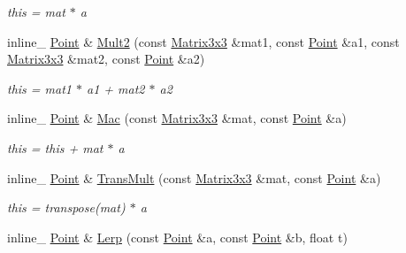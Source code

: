 \begin{DoxyCompactItemize}
\begin{DoxyCompactList}\small\item\em this = mat $\ast$ a \end{DoxyCompactList}\item 
\hypertarget{class_point_af01e8da4c2b949ca9729cab295c8a67b}{inline\+\_\+ \hyperlink{class_point}{Point} \& \hyperlink{class_point_af01e8da4c2b949ca9729cab295c8a67b}{Mult2} (const \hyperlink{class_matrix3x3}{Matrix3x3} \&mat1, const \hyperlink{class_point}{Point} \&a1, const \hyperlink{class_matrix3x3}{Matrix3x3} \&mat2, const \hyperlink{class_point}{Point} \&a2)}\label{class_point_af01e8da4c2b949ca9729cab295c8a67b}

\begin{DoxyCompactList}\small\item\em this = mat1 $\ast$ a1 + mat2 $\ast$ a2 \end{DoxyCompactList}\item 
\hypertarget{class_point_a9869c21470aa62c9041eeea1e451cef0}{inline\+\_\+ \hyperlink{class_point}{Point} \& \hyperlink{class_point_a9869c21470aa62c9041eeea1e451cef0}{Mac} (const \hyperlink{class_matrix3x3}{Matrix3x3} \&mat, const \hyperlink{class_point}{Point} \&a)}\label{class_point_a9869c21470aa62c9041eeea1e451cef0}

\begin{DoxyCompactList}\small\item\em this = this + mat $\ast$ a \end{DoxyCompactList}\item 
\hypertarget{class_point_ac33e525bd7c94a51defb1975915f63c9}{inline\+\_\+ \hyperlink{class_point}{Point} \& \hyperlink{class_point_ac33e525bd7c94a51defb1975915f63c9}{Trans\+Mult} (const \hyperlink{class_matrix3x3}{Matrix3x3} \&mat, const \hyperlink{class_point}{Point} \&a)}\label{class_point_ac33e525bd7c94a51defb1975915f63c9}

\begin{DoxyCompactList}\small\item\em this = transpose(mat) $\ast$ a \end{DoxyCompactList}\item 
\hypertarget{class_point_a933799ae1f2b356eab7ef4165bedf150}{inline\+\_\+ \hyperlink{class_point}{Point} \& \hyperlink{class_point_a933799ae1f2b356eab7ef4165bedf150}{Lerp} (const \hyperlink{class_point}{Point} \&a, const \hyperlink{class_point}{Point} \&b, float t)}\label{class_point_a933799ae1f2b356eab7ef4165bedf150}


\end{DoxyCompactItemize}
